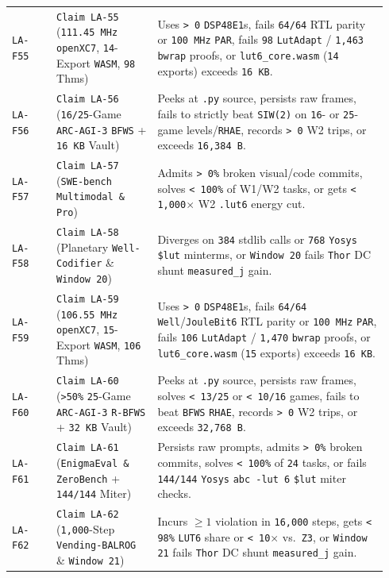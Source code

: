 \documentclass[10pt]{article}
\begin{document}
{\begin{longtable}{@{}L{0.11\linewidth}L{0.25\linewidth}L{0.58\linewidth}@{}}
\texttt{LA-F55} & \texttt{Claim LA-55} (\texttt{111.45 MHz openXC7}, \texttt{14}-Export \texttt{WASM}, \texttt{98} Thms) & Uses \texttt{> 0} \texttt{DSP48E1}s, fails \texttt{64/64} RTL parity or \texttt{100 MHz} \texttt{PAR}, fails \texttt{98} \texttt{LutAdapt} / \texttt{1,463} \texttt{bwrap} proofs, or \texttt{lut6\_core.wasm} (\texttt{14} exports) exceeds \texttt{16 KB}. \\
\texttt{LA-F56} & \texttt{Claim LA-56} (\texttt{16/25}-Game \texttt{ARC-AGI-3} \texttt{BFWS} + \texttt{16 KB} Vault) & Peeks at \texttt{.py} source, persists raw frames, fails to strictly beat \texttt{SIW(2)} on \texttt{16}- or \texttt{25}-game levels/\texttt{RHAE}, records \texttt{> 0} W2 trips, or exceeds \texttt{16,384 B}. \\
\texttt{LA-F57} & \texttt{Claim LA-57} (\texttt{SWE-bench Multimodal \& Pro}) & Admits \texttt{> 0\%} broken visual/code commits, solves \texttt{< 100\%} of W1/W2 tasks, or gets \texttt{< 1,000$\times$} W2 \texttt{.lut6} energy cut. \\
\texttt{LA-F58} & \texttt{Claim LA-58} (Planetary \texttt{Well-Codifier} \& \texttt{Window 20}) & Diverges on \texttt{384} stdlib calls or \texttt{768} \texttt{Yosys} \texttt{\$lut} minterms, or \texttt{Window 20} fails \texttt{Thor} DC shunt \texttt{measured\_j} gain. \\
\texttt{LA-F59} & \texttt{Claim LA-59} (\texttt{106.55 MHz openXC7}, \texttt{15}-Export \texttt{WASM}, \texttt{106} Thms) & Uses \texttt{> 0} \texttt{DSP48E1}s, fails \texttt{64/64} \texttt{Well}/\texttt{JouleBit6} RTL parity or \texttt{100 MHz} \texttt{PAR}, fails \texttt{106} \texttt{LutAdapt} / \texttt{1,470} \texttt{bwrap} proofs, or \texttt{lut6\_core.wasm} (\texttt{15} exports) exceeds \texttt{16 KB}. \\
\texttt{LA-F60} & \texttt{Claim LA-60} (\texttt{>50\%} \texttt{25}-Game \texttt{ARC-AGI-3} \texttt{R-BFWS} + \texttt{32 KB} Vault) & Peeks at \texttt{.py} source, persists raw frames, solves \texttt{< 13/25} or \texttt{< 10/16} games, fails to beat \texttt{BFWS} \texttt{RHAE}, records \texttt{> 0} W2 trips, or exceeds \texttt{32,768 B}. \\
\texttt{LA-F61} & \texttt{Claim LA-61} (\texttt{EnigmaEval \& ZeroBench} + \texttt{144/144} Miter) & Persists raw prompts, admits \texttt{> 0\%} broken commits, solves \texttt{< 100\%} of \texttt{24} tasks, or fails \texttt{144/144} \texttt{Yosys} \texttt{abc -lut 6} \texttt{\$lut} miter checks. \\
\texttt{LA-F62} & \texttt{Claim LA-62} (\texttt{1,000}-Step \texttt{Vending-BALROG} \& \texttt{Window 21}) & Incurs $\ge 1$ violation in \texttt{16,000} steps, gets \texttt{< 98\%} \texttt{LUT6} share or \texttt{< 10$\times$} vs.\ \texttt{Z3}, or \texttt{Window 21} fails \texttt{Thor} DC shunt \texttt{measured\_j} gain. \\

\end{longtable}}
\end{document}
